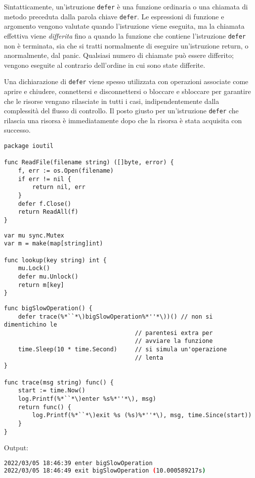 Sintatticamente, un'istruzione \verb|defer| è una funzione ordinaria o una chiamata di metodo preceduta dalla parola chiave \verb|defer|.
Le espressioni di funzione e argomento vengono valutate quando l'istruzione viene eseguita, ma la chiamata effettiva viene \textit{differita} fino a quando la funzione che contiene l'istruzione \verb|defer| non è terminata, sia che si tratti normalmente di eseguire un'istruzione return, o anormalmente, dal panic.
Qualsiasi numero di chiamate può essere differito;
vengono eseguite al contrario dell'ordine in cui sono state differite.

Una dichiarazione di \verb|defer| viene spesso utilizzata con operazioni associate come aprire e chiudere, connettersi e disconnettersi o bloccare e sbloccare per garantire che le risorse vengano rilasciate in tutti i casi, indipendentemente dalla complessità del flusso di controllo.
Il posto giusto per un'istruzione \verb|defer| che rilascia una risorsa è immediatamente dopo che la risorsa è stata acquisita con successo.
\begin{lstlisting}[frame=single, label={lst:lstlisting4-8.1}]
package ioutil

func ReadFile(filename string) ([]byte, error) {
    f, err := os.Open(filename)
    if err != nil {
        return nil, err
    }
    defer f.Close()
    return ReadAll(f)
}
\end{lstlisting}
\begin{lstlisting}[frame=single, label={lst:lstlisting4-8.2}]
var mu sync.Mutex
var m = make(map[string]int)

func lookup(key string) int {
    mu.Lock()
    defer mu.Unlock()
    return m[key]
}
\end{lstlisting}
\begin{lstlisting}[frame=single, label={lst:lstlisting4-8.3}]
func bigSlowOperation() {
    defer trace(%*``*\)bigSlowOperation%*''*\))() // non si dimentichino le
                                     // parentesi extra per
                                     // avviare la funzione
    time.Sleep(10 * time.Second)     // si simula un'operazione
                                     // lenta
}

func trace(msg string) func() {
    start := time.Now()
    log.Printf(%*``*\)enter %s%*''*\), msg)
    return func() {
        log.Printf(%*``*\)exit %s (%s)%*''*\), msg, time.Since(start))
    }
}
\end{lstlisting}
Output:
\begin{lstlisting}[language=bash, frame=L, label={lst:lstlisting4-8.4}]
2022/03/05 18:46:39 enter bigSlowOperation
2022/03/05 18:46:49 exit bigSlowOperation (10.000589217s)
\end{lstlisting}
